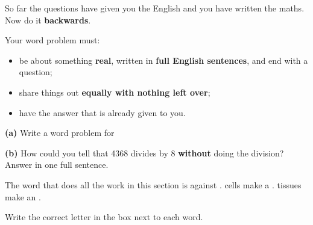 \documentclass[12pt,a4paper]{article}
\begin{document}

\begin{yourturn}
  So far the questions have given you the English and you have written the maths.
  Now do it \textbf{backwards}.

  \medskip
  Your word problem must:
  \begin{itemize}
    \item be about something \textbf{real}, written in \textbf{full English
          sentences}, and end with a question;
    \item share things out \textbf{equally with nothing left over};
    \item have the answer that is already given to you.
  \end{itemize}
\end{yourturn}

\noindent\textbf{(a)} Write a word problem for \quad {}

\vspace{10pt}
\noindent\textbf{(b)} How could you tell that 4368 divides by 8 \textbf{without} doing
the division? Answer in one full sentence.


\begin{remember}
  The word that does all the work in this section is  against
  .  cells make a .  tissues
  make an .
\end{remember}


\noindent Write the correct letter in the box next to each word.
\end{document}
